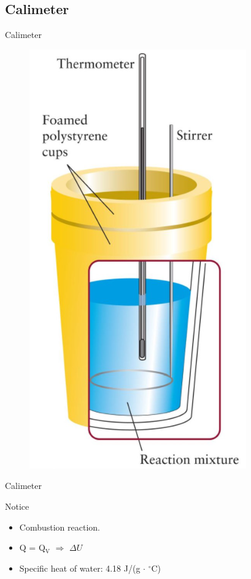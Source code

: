 \documentclass[12pt,compress]{beamer}
\begin{document}
\subsection{Calimeter}
\begin{frame}{Calimeter}
    \begin{figure}
        \includegraphics[height=0.8\textheight]{Calimeter.png}
    \end{figure}
\end{frame}
\begin{frame}{Calimeter}
    \begin{block}{Notice}
        \begin{itemize}
            \item Combustion reaction.
            \item Q = Q$_\text{V}$ $\Rightarrow$ $\Delta U$
            \item Specific heat of water: 4.18 J/(g $\cdot$ $^\circ$C)
        \end{itemize}
    \end{block}
\end{frame}
\end{document}
